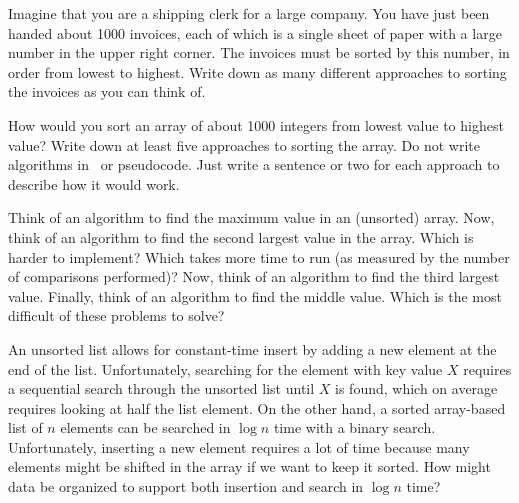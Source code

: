 \begin{exercises}
\item
Imagine that you are a shipping clerk for a large company.
You have just been handed about 1000 invoices, each of which is a
single sheet of paper with a large number in the upper right corner.
The invoices must be sorted by this number, in order from lowest to
highest.
Write down as many different approaches to sorting the invoices as you
can think of.

\item
How would you sort an array of about 1000 integers from lowest value
to highest value?
Write down at least five approaches to sorting the array.
Do not write algorithms in \Lang\ or pseudocode.
Just write a sentence or two for each approach to describe how it would
work.

\item
Think of an algorithm to find the maximum value in an (unsorted)
array.
Now, think of an algorithm to find the second largest value in the
array.
Which is harder to implement? Which takes more time to run (as
measured by the number of comparisons performed)?
Now, think of an algorithm to find the third largest value.
Finally, think of an algorithm to find the middle value.
Which is the most difficult of these problems to solve?

\item
An unsorted list allows for constant-time
insert by adding a new element at the end of the list.
Unfortunately, searching for the element with key value $X$ requires
a sequential search through the unsorted list until $X$ is found,
which on average requires looking at half the list element.
On the other hand, a sorted array-based list of $n$ elements can be
searched in \(\log n\) time with a binary search.
Unfortunately, inserting a new element requires a lot of time because
many elements might be shifted in the array if we want to keep it
sorted.
How might data be organized to support both insertion and search in
\(\log n\) time?

\end{exercises}
